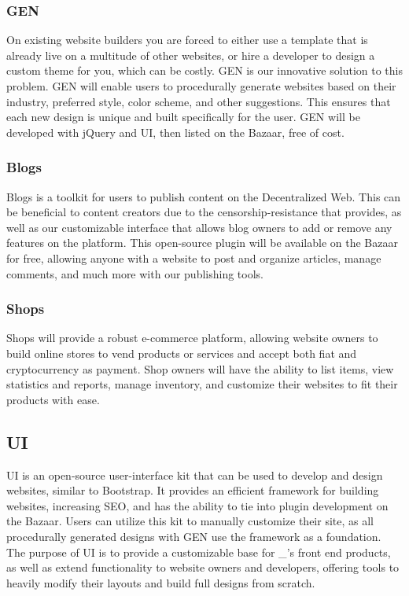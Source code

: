 \documentclass{kwp-builder}
\begin{document}
\subsubsection{\konjure GEN}

\tab On existing website builders you are forced to either use a template that is already live on a multitude of other websites, or hire a developer to design a custom theme for you, which can be costly. \konjure GEN is our innovative solution to this problem. GEN will enable users to procedurally generate websites based on their industry, preferred style, color scheme, and other suggestions. This ensures that each new design is unique and built specifically for the user. GEN will be developed with jQuery and \konjure UI, then listed on the Bazaar, free of cost.

\newpage

\subsubsection{\konjure Blogs}

\tab \konjure Blogs is a toolkit for users to publish content on the Decentralized Web. This can be beneficial to content creators due to the censorship-resistance that \konjure provides, as well as our customizable interface that allows blog owners to add or remove any features on the platform. This open-source plugin will be available on the Bazaar for free, allowing anyone with a \konjure website to post and organize articles, manage comments, and much more with our publishing tools.

\subsubsection{\konjure Shops}

\tab \konjure Shops will provide a robust e-commerce platform, allowing website owners to build online stores to vend products or services and accept both fiat and cryptocurrency as payment. Shop owners will have the ability to list items, view statistics and reports, manage inventory, and customize their websites to fit their products with ease.

\subsection{\konjure UI}

\tab \konjure UI is an open-source user-interface kit that can be used to develop and design websites, similar to Bootstrap. It provides an efficient framework for building websites, increasing SEO, and has the ability to tie into plugin development on the Bazaar. Users can utilize this kit to manually customize their \konjure site, as all procedurally generated designs with \konjure GEN use the framework as a foundation. The purpose of \konjure UI is to provide a customizable base for \konjure\_{’}s front end products, as well as extend functionality to website owners and developers, offering tools to heavily modify their layouts and build full designs from scratch.
\end{document}
